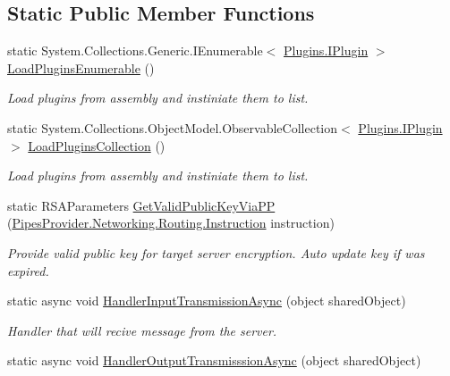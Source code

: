 \subsection*{Static Public Member Functions}
\begin{DoxyCompactItemize}
\item 
static System.\+Collections.\+Generic.\+I\+Enumerable$<$ \mbox{\hyperlink{interface_uniform_client_1_1_plugins_1_1_i_plugin}{Plugins.\+I\+Plugin}} $>$ \mbox{\hyperlink{class_uniform_client_1_1_base_client_aa60dbfa5bd8c46659aec7738193315f1}{Load\+Plugins\+Enumerable}} ()
\begin{DoxyCompactList}\small\item\em Load plugins from assembly and instiniate them to list. \end{DoxyCompactList}\item 
static System.\+Collections.\+Object\+Model.\+Observable\+Collection$<$ \mbox{\hyperlink{interface_uniform_client_1_1_plugins_1_1_i_plugin}{Plugins.\+I\+Plugin}} $>$ \mbox{\hyperlink{class_uniform_client_1_1_base_client_a99ae0bb1dd5bef374fcedb3f873bfe8b}{Load\+Plugins\+Collection}} ()
\begin{DoxyCompactList}\small\item\em Load plugins from assembly and instiniate them to list. \end{DoxyCompactList}\item 
static R\+S\+A\+Parameters \mbox{\hyperlink{class_uniform_client_1_1_base_client_a849e820e6135840e615b759cb09cd2dd}{Get\+Valid\+Public\+Key\+Via\+PP}} (\mbox{\hyperlink{class_pipes_provider_1_1_networking_1_1_routing_1_1_instruction}{Pipes\+Provider.\+Networking.\+Routing.\+Instruction}} instruction)
\begin{DoxyCompactList}\small\item\em Provide valid public key for target server encryption. Auto update key if was expired. \end{DoxyCompactList}\item 
static async void \mbox{\hyperlink{class_uniform_client_1_1_base_client_a8b0bf0f5c032239a7b1bdc73d2d5ad3d}{Handler\+Input\+Transmission\+Async}} (object shared\+Object)
\begin{DoxyCompactList}\small\item\em Handler that will recive message from the server. \end{DoxyCompactList}\item 
static async void \mbox{\hyperlink{class_uniform_client_1_1_base_client_a233b9fc7f1cdc4df399115938afd917d}{Handler\+Output\+Transmisssion\+Async}} (object shared\+Object)

\end{DoxyCompactItemize}
